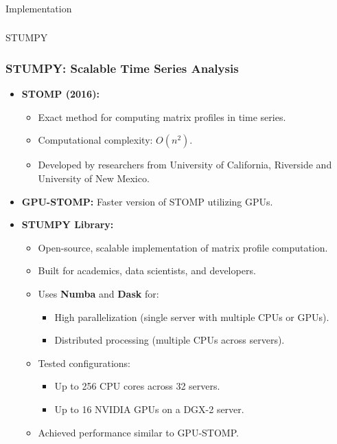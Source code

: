 \begin{frame}[fragile]\frametitle{}
\begin{center}
{\Large Implementation}
\end{center}
\end{frame}

\begin{frame}[fragile]\frametitle{}
\begin{center}
{\Large STUMPY}
\end{center}
\end{frame}

\begin{frame}[fragile]\frametitle{STUMPY: Scalable Time Series Analysis}
    \begin{itemize}
        \item \textbf{STOMP (2016):}
        \begin{itemize}
            \item Exact method for computing matrix profiles in time series.
            \item Computational complexity: $O(n^2)$.
            \item Developed by researchers from University of California, Riverside and University of New Mexico.
        \end{itemize}
        \item \textbf{GPU-STOMP:} Faster version of STOMP utilizing GPUs.
        \item \textbf{STUMPY Library:}
        \begin{itemize}
            \item Open-source, scalable implementation of matrix profile computation.
            \item Built for academics, data scientists, and developers.
            \item Uses \textbf{Numba} and \textbf{Dask} for:
            \begin{itemize}
                \item High parallelization (single server with multiple CPUs or GPUs).
                \item Distributed processing (multiple CPUs across servers).
            \end{itemize}
            \item Tested configurations:
            \begin{itemize}
                \item Up to 256 CPU cores across 32 servers.
                \item Up to 16 NVIDIA GPUs on a DGX-2 server.
            \end{itemize}
            \item Achieved performance similar to GPU-STOMP.
        \end{itemize}
    \end{itemize}
\end{frame}


